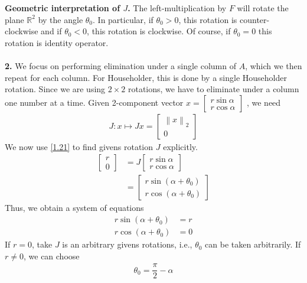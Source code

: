 \documentclass[a4paper,oneside]{book}
\numberwithin{equation}{chapter}
\begin{document}
\textbf{Geometric interpretation of $J$.} The left-multiplication by $F$ will rotate the plane $\mathbb{R}^2$ by the angle $\theta _0$. In particular, if $\theta _0>0$, this rotation is counter-clockwise and if $\theta _0<0$, this rotation is clockwise. Of course, if $\theta _0 =0$ this rotation is identity operator.\\
\\
\textbf{2.} We focus on performing elimination under a single column of $A$, which we then repeat for each column. For Householder, this is done by a single Householder rotation. Since we are using $2\times 2$ rotations, we have to eliminate under a column one number at a time. Given 2-component vector $x = \left[ {\begin{array}{*{20}{c}}
{r\sin \alpha }\\
{r\cos \alpha }
\end{array}} \right]$ , we need 
\begin{align}
\label{1.21}
J:x \mapsto Jx = \left[ {\begin{array}{*{20}{c}}
{{{\left\| x \right\|}_2}}\\
0
\end{array}} \right]
\end{align}
We now use \eqref{1.21} to find givens rotation $J$ explicitly.
\begin{align}
\left[ {\begin{array}{*{20}{c}}
r\\
0
\end{array}} \right] &= J\left[ {\begin{array}{*{20}{c}}
{r\sin \alpha }\\
{r\cos \alpha }
\end{array}} \right]\\
& = \left[ {\begin{array}{*{20}{c}}
{r\sin \left( {\alpha  + {\theta _0}} \right)}\\
{r\cos \left( {\alpha  + {\theta _0}} \right)}
\end{array}} \right]
\end{align}
Thus, we obtain a system of equations
\begin{align}
\label{1.24}
r\sin \left( {\alpha  + {\theta _0}} \right) &= r\\
r\cos \left( {\alpha  + {\theta _0}} \right) &= 0 \label{1.25}
\end{align}
If $r=0$, take $J$ is an arbitrary givens rotations, i.e.,  $\theta _0$ can be taken arbitrarily. If $r \ne 0$, we can choose
\begin{align}
{\theta _0} = \dfrac{\pi }{2} - \alpha 
\end{align}
\end{document}
